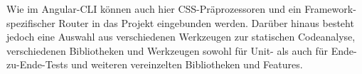 Wie im Angular-\gls{CLI} können auch hier CSS-Präprozessoren und ein Framework-spezifischer Router in das Projekt eingebunden werden. Darüber hinaus besteht jedoch eine Auswahl aus verschiedenen Werkzeugen zur statischen Codeanalyse, verschiedenen Bibliotheken und Werkzeugen sowohl für Unit- als auch für Ende-zu-Ende-Tests und weiteren vereinzelten Bibliotheken und Features.





